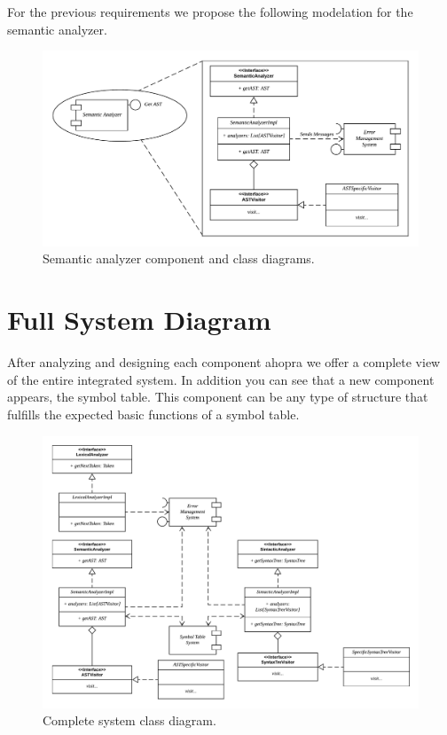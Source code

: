 For the previous requirements we propose the following modelation for the semantic analyzer.

\begin{figure}[h!]
    \includegraphics[width=\textwidth]{images/sema-diagram.pdf}
    \centering
    \caption[Semantic analyzer component and class diagrams]{Semantic analyzer component and class diagrams.}
    \label{fig:sema-diag}
\end{figure}

\section{Full System Diagram}
After analyzing and designing each component ahopra we offer a
complete view of the entire integrated system. In addition
you can see that a new component appears, the symbol table.
This component can be any type of structure that fulfills the
expected basic functions of a symbol table.

\begin{figure}[h!]
    \includegraphics[scale=0.4]{images/full-diagram.pdf}
    \centering
    \caption[Complete system class diagram]{Complete system class diagram.}
    \label{fig:full-diag}
\end{figure}